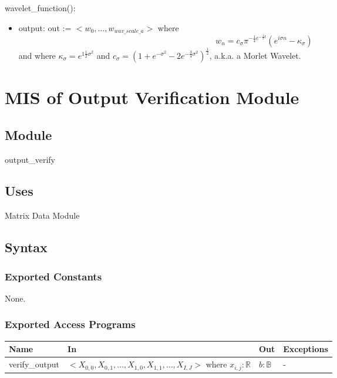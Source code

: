 \documentclass[12pt, titlepage]{article}
\begin{document}
\noindent wavelet\_function():
\begin{itemize}
\item output: out := $< w_0, \dots, w_{wav\_scale\_a}>$ where 
\begin{equation}
w_n = c_\sigma \pi^{-\frac{1}{4} e^{- \frac{1}{2} t}} (e^{i \sigma n} - \kappa_\sigma)
\end{equation}
and where $ \kappa_\sigma = e^{1 \frac{1}{2} \sigma^2}$  and  $c_\sigma = (1 + e^{- \sigma^2} - 2 e^{- \frac{3}{4} \sigma^2})^{\frac{1}{2}}$, a.k.a. a Morlet Wavelet.
\end{itemize}

 
  
\section{MIS of Output Verification Module} \label{Module} 



\subsection{Module}
output\_verify

\subsection{Uses}
Matrix Data Module 
\subsection{Syntax}

\subsubsection{Exported Constants}
None.
\subsubsection{Exported Access Programs}

\begin{center}
\begin{tabular}{p{2cm} p{4cm} p{4cm} p{2cm}}
\hline
\textbf{Name} & \textbf{In} & \textbf{Out} & \textbf{Exceptions} \\
\hline
verify\_output & $<X_{0,0},X_{0,1},\dots, X_{1,0},X_{1,1},\dots, X_{I,J}>$ where $ x_{i,j}:\mathbb{R}$ & $b: \mathbb{B}$ &  -\\
\hline
\end{tabular}
\end{center}
\end{document}
